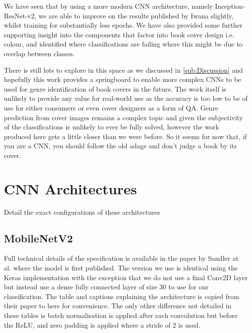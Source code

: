 \documentclass[12pt]{article}
\numberwithin{equation}{section}
\numberwithin{figure}{section}
\begin{document}
We have seen that by using a more modern CNN architecture, namely Inception-ResNet-v2, we are able to improve on the results published by Iwana slightly, whilst training for substantially less epochs. We have also provided some further supporting insight into the components that factor into book cover design i.e. colour, and identified where classifications are failing where this might be due to overlap between classes.

There is still lots to explore in this space as we discussed in \cref{sub:Discussion} and hopefully this work provides a springboard to enable more complex CNNs to be used for genre identification of book covers in the future. The work itself is unlikely to provide any value for real-world use as the accuracy is too low to be of use for either consumers or even cover designers as a form of QA. Genre prediction from cover images remains a complex topic and given the subjectivity of the classifications is unlikely to ever be fully solved, however the work produced here gets a little closer than we were before. So it seems for now that, if you are a CNN, you should follow the old adage and don't judge a book by its cover.


 

\appendix

\section{CNN Architectures} 
\label{sec:CNN_Architectures} 
Detail the exact configurations of these architectures
\subsection{MobileNetV2} 
\label{sub:MobileNetV2} 
Full technical details of the specification is available in the paper by Sandler at al. \cite{Sandler2018} where the model is first published. The version we use is identical using the Keras implementation with the exception that we do not use a final Conv2D layer but instead use a dense fully connected layer of size 30 to use for our classification. The table and captions explaining the architecture is copied from their paper to here for convenience. The only other difference not detailed in these tables is batch normalisation is applied after each convolution but before the ReLU, and zero padding is applied where a stride of 2 is used. 
\end{document}
